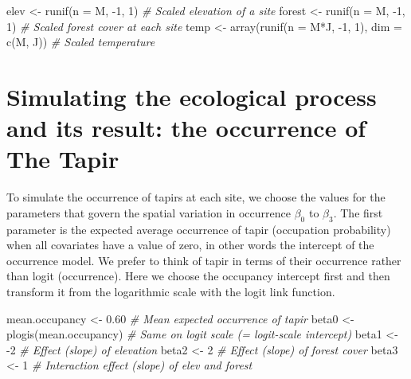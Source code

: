 \documentclass[
]{book}
\newenvironment{Shaded}{\begin{snugshade}}{\end{snugshade}}
\newcommand{\AttributeTok}[1]{\textcolor[rgb]{0.77,0.63,0.00}{#1}}
\newcommand{\CommentTok}[1]{\textcolor[rgb]{0.56,0.35,0.01}{\textit{#1}}}
\newcommand{\DecValTok}[1]{\textcolor[rgb]{0.00,0.00,0.81}{#1}}
\newcommand{\FloatTok}[1]{\textcolor[rgb]{0.00,0.00,0.81}{#1}}
\newcommand{\FunctionTok}[1]{\textcolor[rgb]{0.00,0.00,0.00}{#1}}
\newcommand{\NormalTok}[1]{#1}
\newcommand{\OtherTok}[1]{\textcolor[rgb]{0.56,0.35,0.01}{#1}}
\newcommand{\SpecialCharTok}[1]{\textcolor[rgb]{0.00,0.00,0.00}{#1}}
\begin{document}
\begin{Shaded}
\begin{Highlighting}[]
\NormalTok{elev }\OtherTok{\textless{}{-}} \FunctionTok{runif}\NormalTok{(}\AttributeTok{n =}\NormalTok{ M, }\SpecialCharTok{{-}}\DecValTok{1}\NormalTok{, }\DecValTok{1}\NormalTok{)             }\CommentTok{\# Scaled elevation of a site}
\NormalTok{forest }\OtherTok{\textless{}{-}} \FunctionTok{runif}\NormalTok{(}\AttributeTok{n =}\NormalTok{ M, }\SpecialCharTok{{-}}\DecValTok{1}\NormalTok{, }\DecValTok{1}\NormalTok{)           }\CommentTok{\# Scaled forest cover at each site}
\NormalTok{temp }\OtherTok{\textless{}{-}} \FunctionTok{array}\NormalTok{(}\FunctionTok{runif}\NormalTok{(}\AttributeTok{n =}\NormalTok{ M}\SpecialCharTok{*}\NormalTok{J, }\SpecialCharTok{{-}}\DecValTok{1}\NormalTok{, }\DecValTok{1}\NormalTok{), }\AttributeTok{dim =} \FunctionTok{c}\NormalTok{(M, J)) }\CommentTok{\# Scaled temperature}
\end{Highlighting}
\end{Shaded}

\hypertarget{simulating-the-ecological-process-and-its-result-the-occurrence-of-the-tapir}{%
\section{Simulating the ecological process and its result: the occurrence of The Tapir}\label{simulating-the-ecological-process-and-its-result-the-occurrence-of-the-tapir}}

To simulate the occurrence of tapirs at each site, we choose the values for the parameters that govern the spatial variation in occurrence \(β_{0}\) to \(β_{3}\). The first parameter is the expected average occurrence of tapir (occupation probability) when all covariates have a value of zero, in other words the intercept of the occurrence model. We prefer to think of tapir in terms of their occurrence rather than logit (occurrence). Here we choose the occupancy intercept first and then transform it from the logarithmic scale with the logit link function.

\begin{Shaded}
\begin{Highlighting}[]
\NormalTok{mean.occupancy }\OtherTok{\textless{}{-}} \FloatTok{0.60}         \CommentTok{\# Mean expected occurrence of tapir}
\NormalTok{beta0 }\OtherTok{\textless{}{-}} \FunctionTok{plogis}\NormalTok{(mean.occupancy) }\CommentTok{\# Same on logit scale (= logit{-}scale intercept)}
\NormalTok{beta1 }\OtherTok{\textless{}{-}} \SpecialCharTok{{-}}\DecValTok{2}                    \CommentTok{\# Effect (slope) of elevation}
\NormalTok{beta2 }\OtherTok{\textless{}{-}} \DecValTok{2}                     \CommentTok{\# Effect (slope) of forest cover}
\NormalTok{beta3 }\OtherTok{\textless{}{-}} \DecValTok{1}                     \CommentTok{\# Interaction effect (slope) of elev and forest}
\end{Highlighting}
\end{Shaded}
\end{document}

